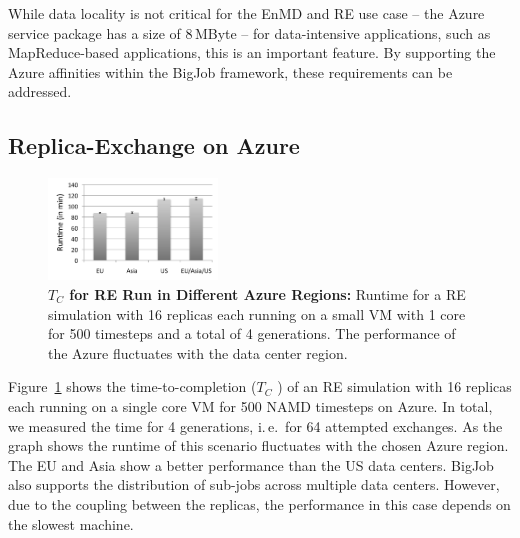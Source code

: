 \documentclass[conference,final]{IEEEtran}
\newcommand{\up}{\vspace*{-1em}}
\newcommand{\tc}{$T_{C}$ }
\newcommand{\jhanote}[1]{ {\textcolor{red} { ***SJ: #1 }}}
\newcommand{\jhanote}[1]{}
\begin{document}

While data locality is not critical for the EnMD and RE use case --
the Azure service package has a size of 8\,MByte -- for data-intensive
applications, such as MapReduce-based applications, this is an
important feature. By supporting the Azure affinities within the
BigJob framework, these requirements can be addressed.  \up

\subsection{Replica-Exchange on Azure}

\begin{figure}[t]
    \centering
        \includegraphics[width=0.4\textwidth]{performance/repex_runtime_per_region.pdf}
        \up
        \caption{\textbf{\tc for RE Run in Different Azure Regions:}
          Runtime for a RE simulation with 16 replicas each running on
          a small VM with 1 core for 500 timesteps and a total of 4
          generations. The performance of the Azure fluctuates with
          the data center region.}
    \label{fig:performance_repex_runtime_per_region}
    \up
\end{figure}

Figure~\ref{fig:performance_repex_runtime_per_region} shows the
time-to-completion (\tc) of an RE simulation with 16 replicas each
running on a single core VM for 500 NAMD timesteps on Azure. In total,
we measured the time for 4 generations, i.\,e.\ for 64 attempted
exchanges. As the graph shows the runtime of this scenario fluctuates
with the chosen Azure region. The EU and Asia show a better
performance than the US data centers. BigJob also supports the
distribution of sub-jobs across multiple data centers. However, due to
the coupling between the replicas, the performance in this case
depends on the slowest machine.
\end{document}
